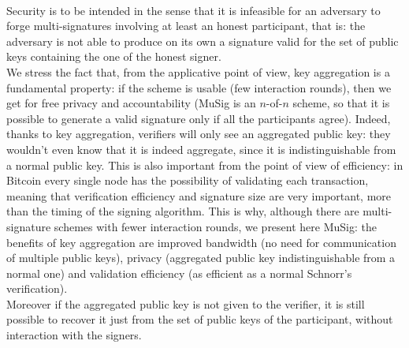 \\
Security is to be intended in the sense that it is infeasible for an adversary to forge multi-signatures involving at least an honest participant, that is: the adversary is not able to produce on its own a signature valid for the set of public keys containing the one of the honest signer.
\\
We stress the fact that, from the applicative point of view, key aggregation is a fundamental property: if the scheme is usable (few interaction rounds), then we get for free privacy and accountability (MuSig is an $n$-of-$n$ scheme, so that it is possible to generate a valid signature only if all the participants agree). Indeed, thanks to key aggregation, verifiers will only see an aggregated public key: they wouldn't even know that it is indeed aggregate, since it is indistinguishable from a normal public key. This is also important from the point of view of efficiency: in Bitcoin every single node has the possibility of validating each transaction, meaning that verification efficiency and signature size are very important, more than the timing of the signing algorithm. This is why, although there are multi-signature schemes with fewer interaction rounds, we present here MuSig: the benefits of key aggregation are improved bandwidth (no need for communication of multiple public keys), privacy (aggregated public key indistinguishable from a normal one) and validation efficiency (as efficient as a normal Schnorr's verification).
\\
Moreover if the aggregated public key is not given to the verifier, it is still possible to recover it just from the set of public keys of the participant, without interaction with the signers.

